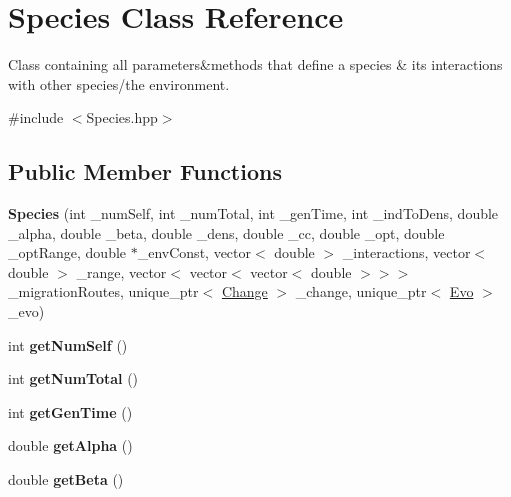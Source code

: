 \hypertarget{classSpecies}{}\section{Species Class Reference}
\label{classSpecies}


Class containing all parameters\&methods that define a species \& it\textquotesingle{}s interactions with other species/the environment.  




{\ttfamily \#include $<$Species.\+hpp$>$}

\subsection*{Public Member Functions}
\begin{DoxyCompactItemize}
\item 
\hypertarget{classSpecies_a385a49104d5d6d6aee34a983e589832b}{}\label{classSpecies_a385a49104d5d6d6aee34a983e589832b} 
{\bfseries Species} (int \+\_\+num\+Self, int \+\_\+num\+Total, int \+\_\+gen\+Time, int \+\_\+ind\+To\+Dens, double \+\_\+alpha, double \+\_\+beta, double \+\_\+dens, double \+\_\+cc, double \+\_\+opt, double \+\_\+opt\+Range, double $\ast$\+\_\+env\+Const, vector$<$ double $>$ \+\_\+interactions, vector$<$ double $>$ \+\_\+range, vector$<$ vector$<$ vector$<$ double $>$$>$$>$ \+\_\+migration\+Routes, unique\+\_\+ptr$<$ \hyperlink{classChange}{Change} $>$ \+\_\+change, unique\+\_\+ptr$<$ \hyperlink{classEvo}{Evo} $>$ \+\_\+evo)
\item 
\hypertarget{classSpecies_acdddfb4cb6f496fee642b7c58f39d3f1}{}\label{classSpecies_acdddfb4cb6f496fee642b7c58f39d3f1} 
int {\bfseries get\+Num\+Self} ()
\item 
\hypertarget{classSpecies_a31566bcf2f8647e9498ee2fec28531fb}{}\label{classSpecies_a31566bcf2f8647e9498ee2fec28531fb} 
int {\bfseries get\+Num\+Total} ()
\item 
\hypertarget{classSpecies_af15e54343492700ff8841c3563bd9a0c}{}\label{classSpecies_af15e54343492700ff8841c3563bd9a0c} 
int {\bfseries get\+Gen\+Time} ()
\item 
\hypertarget{classSpecies_a9951ad56ce265722c633b461f00bbb66}{}\label{classSpecies_a9951ad56ce265722c633b461f00bbb66} 
double {\bfseries get\+Alpha} ()
\item 
\hypertarget{classSpecies_ae7a743e1bd001b01d17384763cdfbdee}{}\label{classSpecies_ae7a743e1bd001b01d17384763cdfbdee} 
double {\bfseries get\+Beta} ()
\item 

\end{DoxyCompactItemize}
